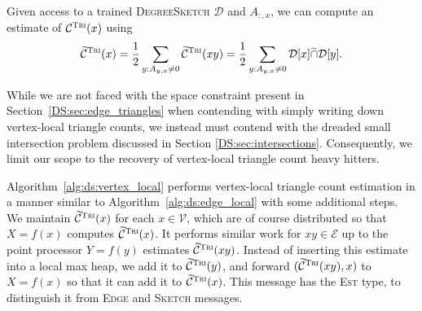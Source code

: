 \documentclass{report}
\newcommand{\algoname}[1]{\textnormal{\textsc{#1}}}
\begin{document}
Given access to a trained \algoname{DegreeSketch} $\mathcal{D}$ and $A_{:,x}$, we can compute an estimate of $\mathcal{C}^{\algoname{Tri}}(x)$ using
%
\begin{equation} \label{eq:tri:edge}
	\widetilde{\mathcal{C}}^{\algoname{Tri}}(x) 
	= \frac{1}{2} \sum_{y: A_{y,x} \neq 0} \widetilde{\mathcal{C}}^{\algoname{Tri}}(xy)  
	= \frac{1}{2} \sum_{y: A_{y,x} \neq 0} \mathcal{D}[x] \widetilde{\cap} \mathcal{D}[y].
\end{equation}
%

While we are not faced with the space constraint present in Section~\ref{DS:sec:edge_triangles} when contending with simply writing down vertex-local triangle counts, we instead must contend with the dreaded small intersection problem discussed in Section \ref{DS:sec:intersections}.
Consequently, we limit our scope to the recovery of vertex-local triangle count heavy hitters.

Algorithm~\ref{alg:ds:vertex_local} performs vertex-local triangle count estimation in a manner similar to Algorithm~\ref{alg:ds:edge_local} with some additional steps. 
We maintain $\widetilde{\mathcal{C}}^\algoname{Tri}(x)$ for each $x \in \mathcal{V}$, which are of course distributed so that $X = f(x)$ computes $\widetilde{\mathcal{C}}^\algoname{Tri}(x)$. 
It performs similar work for $xy \in \mathcal{E}$ up to the point processor $Y = f(y)$ estimates $\widetilde{\mathcal{C}}^\algoname{Tri}(xy)$. 
Instead of inserting this estimate into a local max heap, we add it to $\widetilde{\mathcal{C}}^\algoname{Tri}(y)$, and forward $(\widetilde{\mathcal{C}}^\algoname{Tri}(xy), x)$ to $X = f(x)$ so that it can add it to $\widetilde{\mathcal{C}}^\algoname{Tri}(x)$.
This message has the \algoname{Est} type, to distinguish it from \algoname{Edge} and \algoname{Sketch} messages.
\end{document}
